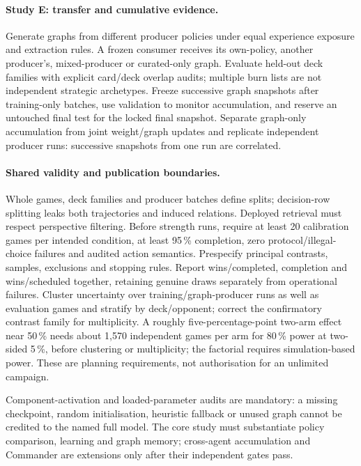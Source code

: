 \documentclass[11pt,a4paper]{article}
\theoremstyle{definition}
\theoremstyle{plain}
\begin{document}
\paragraph{Study E: transfer and cumulative evidence.}
Generate graphs from different producer policies under equal experience
exposure and extraction rules. A frozen consumer receives its own-policy,
another producer's, mixed-producer or curated-only graph. Evaluate held-out
deck families with explicit card/deck overlap audits; multiple burn lists
are not independent strategic archetypes. Freeze successive graph snapshots
after training-only batches, use validation to monitor accumulation, and
reserve an untouched final test for the locked final snapshot. Separate
graph-only accumulation from joint weight/graph updates and replicate
independent producer runs: successive snapshots from one run are correlated.

\paragraph{Shared validity and publication boundaries.}
Whole games, deck families and producer batches define splits; decision-row
splitting leaks both trajectories and induced relations. Deployed retrieval
must respect perspective filtering. Before strength runs, require at least
20 calibration games per intended condition, at least 95\,\% completion,
zero protocol/illegal-choice failures and audited action semantics.
Prespecify principal contrasts, samples, exclusions and stopping rules.
Report wins/completed, completion and wins/scheduled together, retaining
genuine draws separately from operational failures. Cluster uncertainty over
training/graph-producer runs as well as evaluation games and stratify by
deck/opponent; correct the confirmatory contrast family for multiplicity.
A roughly five-percentage-point two-arm effect near 50\,\% needs about 1,570
independent games per arm for 80\,\% power at two-sided 5\,\%, before
clustering or multiplicity; the factorial requires simulation-based power.
These are planning requirements, not authorisation for an unlimited campaign.

Component-activation and loaded-parameter audits are mandatory: a missing
checkpoint, random initialisation, heuristic fallback or unused graph cannot
be credited to the named full model. The core study must substantiate
policy comparison, learning and graph memory; cross-agent accumulation and
Commander are extensions only after their independent gates pass.
\end{document}
